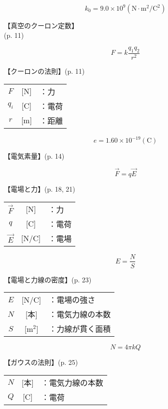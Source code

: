 \documentclass[10pt]{jarticle}
\begin{document}
\newpage
\[
	k_0 = 9.0 \! \times \! 10^9  \mathrm{(N \! \cdot \! m^2/C^2)}
\]


\vskip3mm
【真空のクーロン定数】\\
\hfill {\footnotesize (p. 11)}





\newpage
\[
F = k \frac{q_1 q_2}{r^2}
\]


\vskip3mm
【クーロンの法則】{\footnotesize (p. 11)}

\begin{tabular}{ccl}
$F$	&[N]	&：力 \\
$q_i$	&[C]	&：電荷 \\
$r$	&[m]	&：距離
\end{tabular}




\newpage
\[
e = 1.60 \! \times \! 10^{-19} \mathrm{(C)}
\]


\vskip3mm
【電気素量】{\footnotesize (p. 14)}




\newpage
\[
\vec{F} = q \vec{E}
\]


\vskip3mm
【電場と力】{\footnotesize (p. 18, 21)}

\begin{tabular}{ccl}
$\vec{F}$	&[N]	&：力 \\
$q$	&[C]	&：電荷 \\
$\vec{E}$	&[N/C]	&：電場
\end{tabular}





\newpage
\[
  E = \frac{N}{S}
\]


\vskip3mm
【電場と力線の密度】{\footnotesize (p. 23)}

\begin{tabular}{ccl}
$E$	&[N/C]	&：電場の強さ \\
$N$	&[本]	&：電気力線の本数 \\
$S$	&[m$^2$]	&：力線が貫く面積
\end{tabular}



\newpage
\[
N = 4\pi k Q
\]


\vskip3mm
【ガウスの法則】{\footnotesize (p. 25)}

\begin{tabular}{ccl}
$N$	&[本]	&：電気力線の本数 \\
$Q$	&[C]	&：電荷
\end{tabular}
\end{document}
